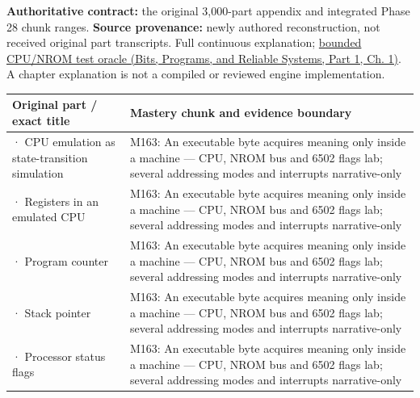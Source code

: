 \hypertarget{appendix-fd090d982a15-phase-28-m163m168-parts-27012800-deterministic-and-trusted-low-level-systems}{}

\textbf{Authoritative contract:} the original 3,000-part appendix and integrated Phase 28 chunk ranges. \textbf{Source provenance:} newly authored reconstruction, not received original part transcripts. {Full continuous explanation}; \href{../01-Bits-Programs-and-Reliable-Systems-P01/main.pdf\#source-file-552a9e2296dc984412c8f06d}{bounded CPU/NROM test oracle (Bits, Programs, and Reliable Systems, Part 1, Ch. 1)}. A chapter explanation is not a compiled or reviewed engine implementation.

{\def\LTcaptype{none} %
\begin{longtable}[]{@{}
  >{\raggedright\arraybackslash}p{}
  >{\raggedright\arraybackslash}p{}@{}}
\toprule\noalign{}
\begin{minipage}[b]{\linewidth}\raggedright
Original part / exact title
\end{minipage} & \begin{minipage}[b]{\linewidth}\raggedright
Mastery chunk and evidence boundary
\end{minipage} \\
\midrule\noalign{}
\endhead
\bottomrule\noalign{}
\endlastfoot
2701 · CPU emulation as state-transition simulation & M163: An executable byte acquires meaning only inside a machine --- CPU, NROM bus and 6502 flags lab; several addressing modes and interrupts narrative-only \\
2702 · Registers in an emulated CPU & M163: An executable byte acquires meaning only inside a machine --- CPU, NROM bus and 6502 flags lab; several addressing modes and interrupts narrative-only \\
2703 · Program counter & M163: An executable byte acquires meaning only inside a machine --- CPU, NROM bus and 6502 flags lab; several addressing modes and interrupts narrative-only \\
2704 · Stack pointer & M163: An executable byte acquires meaning only inside a machine --- CPU, NROM bus and 6502 flags lab; several addressing modes and interrupts narrative-only \\
2705 · Processor status flags & M163: An executable byte acquires meaning only inside a machine --- CPU, NROM bus and 6502 flags lab; several addressing modes and interrupts narrative-only \\

\end{longtable}}

